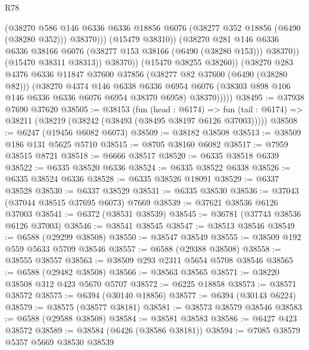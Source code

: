 \begin{lexlean}{R78}
\begin{coremodule}
                          (@38270
                            @586
                            @146
                            @6336
                            @6336
                            @18856
                            @6076
                            (@38277 @352 @18856 (@6490 (@38280 @352)))
                            @38370)))
                      (@15479 @38310))
                    (@38270
                      @281
                      @146
                      @6336
                      @6336
                      @38166
                      @6076
                      (@38277 @153 @38166 (@6490 (@38280 @153)))
                      @38370))
                  (@15470 @38311 @38313))
                @38370))
            (@15470 @38255 @38260))
          (@38270
            @283
            @4376
            @6336
            @11847
            @37600
            @37856
            (@38277 @82 @37600 (@6490 (@38280 @82)))
            (@38270
              @4374
              @146
              @6338
              @6336
              @6954
              @6076
              (@38303 @898 @106 @146 @6336 @6336 @6076 @6954 @38370 @6958)
              @38370)))))
@38495 := @37938 @7690 @37620
@38505 := @38153
    (fun (head : @6174) =>
    fun (tail : @6174) => @38211 (@38219 (@38242 (@38493 (@38495 @38197 @6126 @37003)))))
@38508 := @6247 (@19456 @6082 @6073)
@38509 := @38182 @38508
@38513 := @38509 @186 @131 @5625 @5710
@38515 := @8705 @38160 @6082
@38517 := @7959 @38515 @8721
@38518 := @6666 @38517
@38520 := @6335 @38518 @6339
@38522 := @6335 @38520 @6336
@38524 := @6335 @38522 @6338
@38526 := @6335 @38524 @6336
@38528 := @6335 @38526 @18091
@38529 := @6337 @38528
@38530 := @6337 @38529
@38531 := @6335 @38530
@38536 := @37043 (@37044 @38515 @37695 @6073) @7669
@38539 := @37621 @38536 @6126 @37003
@38541 := @6372 (@38531 @38539)
@38545 := @36781 (@37743 @38536 @6126 @37003)
@38546 := @38541 @38545
@38547 := @38513 @38546
@38549 := @6588 (@29299 @38508)
@38550 := @38547 @38549
@38555 := @38509 @192 @559 @5633 @5709 @38546
@38557 := @6588 (@29388 @38508)
@38558 := @38555 @38557
@38563 := @38509 @293 @2311 @5654 @5708 @38546
@38565 := @6588 (@29482 @38508)
@38566 := @38563 @38565
@38571 := @38220 @38508 @312 @423 @5670 @5707
@38572 := @6225 @18858
@38573 := @38571 @38572
@38575 := @6394 (@30140 @18856)
@38577 := @6394 (@30143 @6224)
@38579 := @38575 (@38577 @38181)
@38581 := @38573 @38579 @38546
@38583 := @6588 (@29588 @38508)
@38584 := @38581 @38583
@38586 := @6427 @423 @38572
@38589 := @38584 (@6426 (@38586 @38181))
@38594 := @7085 @38579 @5357 @5669 @38530 @38539

\end{coremodule}
\end{lexlean}
